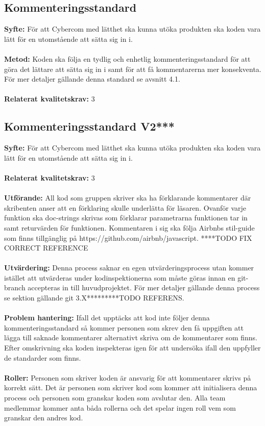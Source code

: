 \documentclass[10pt]{article}
\begin{document}
	\subsection{Kommenteringsstandard}
	\textbf{Syfte:} För att Cybercom med lätthet ska kunna utöka produkten ska koden vara lätt för en utomstående att sätta sig in i.
	\\\\
	\textbf{Metod:} Koden ska följa en tydlig och enhetlig kommenteringsstandard för att göra det lättare att sätta sig in i samt för att få kommentarerna mer konsekventa. För mer detaljer gällande denna standard se avsnitt 4.1.
	\\\\
	\textbf{Relaterat kvalitetskrav:} 3
	\\

	\subsection{Kommenteringsstandard V2***}
	\textbf{Syfte:}	För att Cybercom med lätthet ska kunna utöka produkten ska koden vara lätt för en utomstående att sätta sig in i.
	\\\\
	\textbf{Relaterat kvalitetskrav:} 3
	\\\\
	\textbf{Utförande:} All kod som gruppen skriver ska ha förklarande kommentarer där skribenten anser att en förklaring skulle underlätta för läsaren. Ovanför varje funktion ska doc-strings skrivas som förklarar parametrarna funktionen tar in samt returvärden för funktionen.
	Kommentaren i sig ska följa Airbnbs stil-guide som finns tillgänglig på https://github.com/airbnb/javascript.
	****TODO FIX CORRECT REFERENCE
	\\\\
	\textbf{Utvärdering:} Denna process saknar en egen utvärderingsprocess utan kommer istället att utvärderas under kodinspektionerna som måste göras innan en git-branch accepteras in till huvudprojektet. För mer detaljer gällande denna process se sektion gällande git 3.X*********TODO REFERENS.
	\\\\
	\textbf{Problem hantering:} Ifall det upptäcks att kod inte följer denna kommenteringsstandard så kommer personen som skrev den få uppgiften att lägga till saknade kommentarer alternativt skriva om de kommentarer som finns. Efter omskrivning ska koden inspekteras igen för att undersöka ifall den uppfyller de standarder som finns.
	\\\\
	\textbf{Roller:} Personen som skriver koden är ansvarig för att kommentarer skrivs på korrekt sätt. Det är personen som skriver kod som kommer att initialisera denna process och personen som granskar koden som avslutar den. Alla team medlemmar kommer anta båda rollerna och det spelar ingen roll vem som granskar den andres kod.
	
\end{document}
